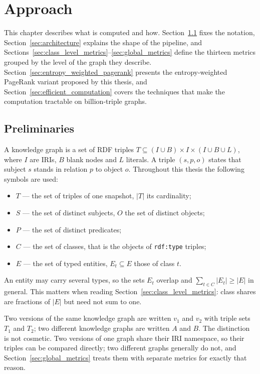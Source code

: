 \chapter{Approach}
\label{chap:approach}

This chapter describes what is computed and how. Section~\ref{sec:preliminaries}
fixes the notation, Section~\ref{sec:architecture} explains the shape of the
pipeline, and Sections~\ref{sec:class_level_metrics}--\ref{sec:global_metrics}
define the thirteen metrics grouped by the level of the graph they describe.
Section~\ref{sec:entropy_weighted_pagerank} presents the entropy-weighted
PageRank variant proposed by this thesis, and
Section~\ref{sec:efficient_computation} covers the techniques that make the
computation tractable on billion-triple graphs.

\section{Preliminaries}
\label{sec:preliminaries}

A knowledge graph is a set of RDF triples $T \subseteq (I \cup B) \times I
\times (I \cup B \cup L)$, where $I$ are \acp{IRI}, $B$ blank nodes and $L$
literals. A triple $(s, p, o)$ states that subject $s$ stands in relation $p$ to
object $o$. Throughout this thesis the following symbols are used:

\begin{itemize}
  \item $T$ --- the set of triples of one snapshot, $|T|$ its cardinality;
  \item $S$ --- the set of distinct subjects, $O$ the set of distinct objects;
  \item $P$ --- the set of distinct predicates;
  \item $C$ --- the set of classes, that is the objects of \texttt{rdf:type} triples;
  \item $E$ --- the set of typed entities, $E_t \subseteq E$ those of class $t$.
\end{itemize}

An entity may carry several types, so the sets $E_t$ overlap and
$\sum_{t \in C} |E_t| \geq |E|$ in general. This matters when reading
Section~\ref{sec:class_level_metrics}: class shares are fractions of $|E|$ but
need not sum to one.

Two versions of the same knowledge graph are written $v_1$ and $v_2$ with triple
sets $T_1$ and $T_2$; two different knowledge graphs are written $A$ and $B$.
The distinction is not cosmetic. Two versions of one graph share their \ac{IRI}
namespace, so their triples can be compared directly; two different graphs
generally do not, and Section~\ref{sec:global_metrics} treats them with separate
metrics for exactly that reason.


